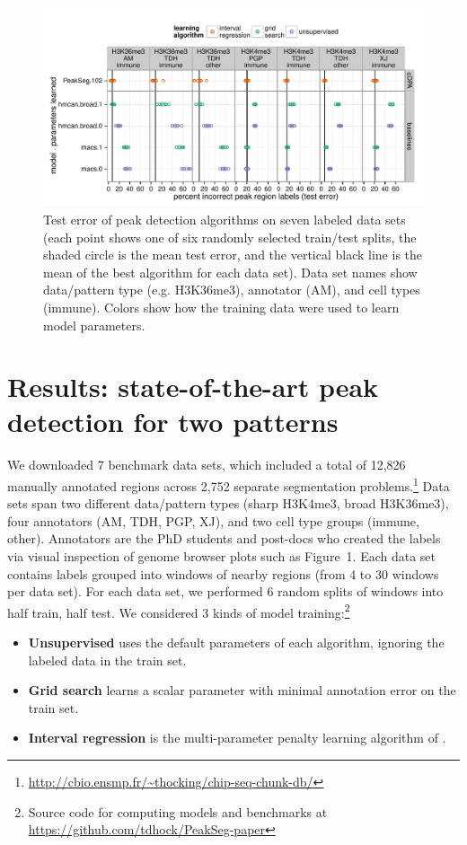 \documentclass{article}
\begin{document}
\begin{figure}[b!]
  \centering
  \includegraphics[width=\textwidth]{figure-dp-peaks-regression-dots}
  \vskip -0.5cm
  \caption{Test error of peak detection algorithms on seven labeled
    data sets (each point shows one of six randomly selected
    train/test splits, the shaded circle is the mean test error, and
    the vertical black line is the mean of the best algorithm for each
    data set). Data set names show data/pattern type (e.g. H3K36me3),
    annotator (AM), and cell types (immune). Colors show how the
    training data were used to learn model parameters.}
  \label{fig:test-error}
\end{figure}

\section{Results: state-of-the-art peak detection
  for two patterns}
\label{sec:results}

We downloaded 7 benchmark data sets, which included a total of 12,826
manually annotated regions across 2,752 separate segmentation
problems.\footnote{\url{http://cbio.ensmp.fr/~thocking/chip-seq-chunk-db/}}
Data sets span two different data/pattern types (sharp H3K4me3, broad
H3K36me3), four annotators (AM, TDH, PGP, XJ), and two cell type
groups (immune, other). 
Annotators are the PhD students and post-docs who created the labels via visual inspection of genome browser plots such as Figure~1.
Each data set contains labels grouped into
windows of nearby regions (from 4 to 30 windows per data set). For
each data set, we performed 6 random splits of windows into half
train, half test.  We
considered 3 kinds of model training:\footnote{Source code for computing models and benchmarks at\\
  \url{https://github.com/tdhock/PeakSeg-paper} }
\begin{itemize}
\item \textbf{Unsupervised} uses the default parameters of each
  algorithm, ignoring the labeled data in the train set.
\item \textbf{Grid search} learns a scalar parameter with minimal
  annotation error on the train set.
\item \textbf{Interval regression} is the multi-parameter
  penalty learning algorithm of \citet{HOCKING-penalties}.
\end{itemize}
\end{document}
